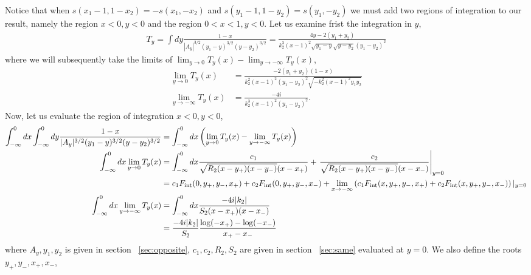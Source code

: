 \documentclass[twoside]{article}
\begin{document}
Notice that when $s(x_1 - 1, 1 - x_2) = -s(x_1, -x_2)$ and $s(y_1 - 1, 1 - y_2) = s(y_1, - y_2)$ we must add two regions of integration to
our result, namely the region $x < 0, y < 0$ and the region $0<x<1, y < 0$. Let us examine frist the integration in $y$,
\begin{align}
  T_y = \int dy\frac{1-x}{|A_y|^{3/2}(y_1 - y)^{3/2}(y - y_2)^{3/2}} = \frac{4y - 2(y_1 + y_2)}{k^3_2(x-1)^2\sqrt{y_1 - y}\sqrt{y - y_2}(y_1 -
  y_2)^2}
\end{align}
where we will subsequently take the limits of $\lim_{y \rightarrow 0}T_y(x) - \lim_{y \rightarrow -\infty}T_y(x)$,
\begin{align}
  \lim_{y \rightarrow 0}T_y(x) &=  \frac{-2(y_1 + y_2)(1 - x)}{k^2_2(x-1)^2(y_1 - y_2)^2\sqrt{-k^2_2(x-1)^2y_1y_2}}\\
  \lim_{y \rightarrow -\infty}T_y(x) &=  \frac{-4i}{k^3_2(x-1)^2(y_1 - y_2)^2}.
\end{align}
Now, let us evaluate the region of integration $x < 0, y < 0$,
\begin{align}
  \int^0_{-\infty}dx\int^0_{-\infty}dy\frac{1-x}{|A_y|^{3/2}(y_1 - y)^{3/2}(y - y_2)^{3/2}} &=  \int^0_{-\infty}dx\left( \lim_{y\rightarrow0}T_y(x) - \lim_{y \rightarrow -\infty}T_y(x) \right)\\
  \int^0_{-\infty}dx\lim_{y \rightarrow 0}T_y(x) &= \int^0_{-\infty}dx  \frac{c_1}{\sqrt{R_2(x - y_+)(x - y_-)}(x - x_+)} +
  \left.\frac{c_2}{\sqrt{R_2(x - y_+)(x - y_-)}(x - x_-)}\right\vert_{y = 0}\\
    &= c_1F_{\rm int}(0, y_+, y_-, x_+) + c_2F_{\rm int}(0, y_+, y_-, x_-)+ \lim_{x \rightarrow -\infty}\left(c_1F_{\rm
    int}(x,y_+,y_-,x_+) + c_2F_{\rm int}(x, y_+,y_-,x_-)\right)\vert_{y = 0}\\
    \int^{0}_{-\infty}dx \lim_{y \rightarrow -\infty}T_y(x) &= \int^0_{-\infty}dx \frac{-4i|k_2|}{S_2(x-x_+)(x-x_-)}\\
    &= \frac{-4i|k_2|}{S_2}\frac{\log(-x_+) - \log(-x_-)}{x_+ - x_-}
\end{align}
where $A_y, y_1, y_2$ is given in section ~\ref{sec:opposite}, $c_1, c_2, R_2, S_2$ are given in section ~\ref{sec:same} evaluated at
$y = 0$. We also define the roots $y_+,y_-, x_+,x_-$,
\end{document}
